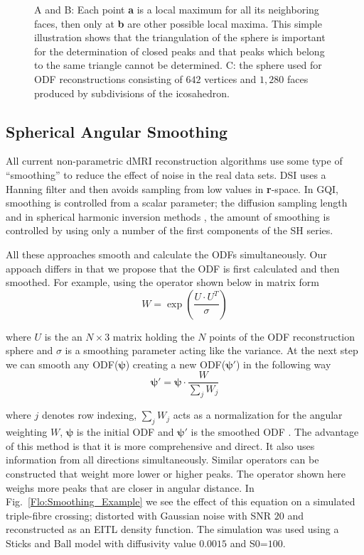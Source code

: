 \documentclass{bioinfo}
\begin{document}
\begin{methods}
\begin{figure}
\centering{}\caption{A and B: Each point \textbf{a} is a local maximum for all its neighboring
faces, then only at \textbf{b} are other possible local maxima. This
simple illustration shows that the triangulation of the sphere is
important for the determination of closed peaks and that peaks which
belong to the same triangle cannot be determined. C: the sphere used
for ODF reconstructions consisting of $642$ vertices and $1,280$
faces produced by subdivisions of the icosahedron.}
\label{Flo:sphere_642}
\end{figure}

\subsection{Spherical Angular Smoothing\label{sub:Spherical-Angular-Smoothing}}

All current non-parametric dMRI reconstruction algorithms use some
type of {}``smoothing'' to reduce the effect of noise in the real
data sets. DSI uses a Hanning filter and then avoids sampling from
low values in \textbf{r}-space. In GQI, smoothing is controlled from
a scalar parameter; the diffusion sampling length and in spherical
harmonic inversion methods \cite{Descoteaux2007MagResMed}, \cite{aganj2010reconstruction}
the amount of smoothing is controlled by using only a number of the
first components of the SH series. 

All these approaches smooth and calculate the ODFs simultaneously.
Our appoach differs in that we propose that the ODF is first calculated
and then smoothed. For example, using the operator shown below in
matrix form\[
W=\exp(\frac{U\cdot U^{T}}{\sigma})\]


\noindent where $U$ is the an $N\times3$ matrix holding the $N$
points of the ODF reconstruction sphere and $\sigma$ is a smoothing
parameter acting like the variance. At the next step we can smooth
any ODF($\bm{\psi}$) creating a new ODF($\bm{\psi}'$) in the following
way\begin{equation}
\bm{\psi}'=\bm{\psi}\cdot\frac{W}{\sum_{j}W_{j}}\label{eq:spherical_gaussian_angular_smoothing}\end{equation}


\noindent where $j$ denotes row indexing, $\sum_{j}W_{j}$ acts as
a normalization for the angular weighting $W$, $\bm{\psi}$ is the
initial ODF and $\bm{\psi}'$ is the smoothed ODF . The advantage
of this method is that it is more comprehensive and direct. It also
uses information from all directions simultaneously. Similar operators
can be constructed that weight more lower or higher peaks. The operator
shown here weighs more peaks that are closer in angular distance.
In Fig.~\ref{Flo:Smoothing_Example} we see the effect of this equation
on a simulated triple-fibre crossing; distorted with Gaussian noise
with SNR $20$ and reconstructed as an EITL density function. The
simulation was used using a Sticks and Ball model with diffusivity
value $0.0015$ and S0=$100$.


\end{methods}
\end{document}
